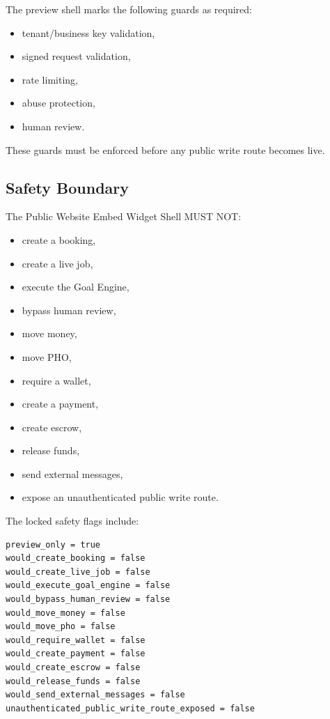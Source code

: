 The preview shell marks the following guards as required:

\begin{itemize}
  \item tenant/business key validation,
  \item signed request validation,
  \item rate limiting,
  \item abuse protection,
  \item human review.
\end{itemize}

These guards must be enforced before any public write route becomes live.

\subsection{Safety Boundary}

The Public Website Embed Widget Shell MUST NOT:

\begin{itemize}
  \item create a booking,
  \item create a live job,
  \item execute the Goal Engine,
  \item bypass human review,
  \item move money,
  \item move PHO,
  \item require a wallet,
  \item create a payment,
  \item create escrow,
  \item release funds,
  \item send external messages,
  \item expose an unauthenticated public write route.
\end{itemize}

The locked safety flags include:

\begin{verbatim}
preview_only = true
would_create_booking = false
would_create_live_job = false
would_execute_goal_engine = false
would_bypass_human_review = false
would_move_money = false
would_move_pho = false
would_require_wallet = false
would_create_payment = false
would_create_escrow = false
would_release_funds = false
would_send_external_messages = false
unauthenticated_public_write_route_exposed = false
\end{verbatim}

